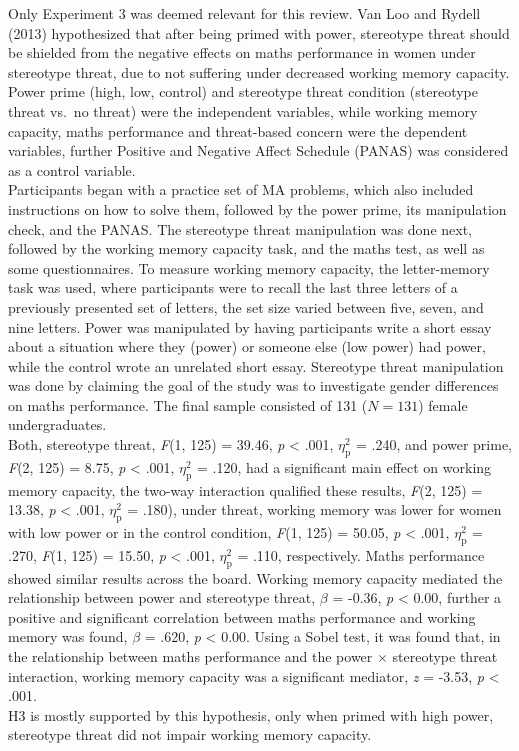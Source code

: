 \documentclass[
  stu,floatsintext]{apa7}
\begin{document}
Only Experiment 3 was deemed relevant for this review.
Van Loo and Rydell (2013) hypothesized that after being primed with power, stereotype threat should be shielded from the negative effects on maths performance in women under stereotype threat, due to not suffering under decreased working memory capacity.\\
Power prime (high, low, control) and stereotype threat condition (stereotype threat vs.~no threat) were the independent variables, while working memory capacity, maths performance and threat-based concern were the dependent variables, further Positive and Negative Affect Schedule (PANAS) was considered as a control variable.\\
Participants began with a practice set of MA problems, which also included instructions on how to solve them, followed by the power prime, its manipulation check, and the PANAS.
The stereotype threat manipulation was done next, followed by the working memory capacity task, and the maths test, as well as some questionnaires.
To measure working memory capacity, the letter-memory task was used, where participants were to recall the last three letters of a previously presented set of letters, the set size varied between five, seven, and nine letters.
Power was manipulated by having participants write a short essay about a situation where they (power) or someone else (low power) had power, while the control wrote an unrelated short essay.
Stereotype threat manipulation was done by claiming the goal of the study was to investigate gender differences on maths performance.
The final sample consisted of 131 (\(N = 131\)) female undergraduates.\\
Both, stereotype threat, \emph{F}(1, 125) = 39.46, \emph{p} \textless{} .001, \(\eta^{2}_{\text{p}}\) = .240, and power prime, \emph{F}(2, 125) = 8.75, \emph{p} \textless{} .001, \(\eta^{2}_{\text{p}}\) = .120, had a significant main effect on working memory capacity, the two-way interaction qualified these results, \emph{F}(2, 125) = 13.38, \emph{p} \textless{} .001, \(\eta^{2}_{\text{p}}\) = .180), under threat, working memory was lower for women with low power or in the control condition, \emph{F}(1, 125) = 50.05, \emph{p} \textless{} .001, \(\eta^{2}_{\text{p}}\) = .270, \emph{F}(1, 125) = 15.50, \emph{p} \textless{} .001, \(\eta^{2}_{\text{p}}\) = .110, respectively.
Maths performance showed similar results across the board.
Working memory capacity mediated the relationship between power and stereotype threat, \(\beta\) = -0.36, \emph{p} \textless{} 0.00, further a positive and significant correlation between maths performance and working memory was found, \(\beta\) = .620, \emph{p} \textless{} 0.00.
Using a Sobel test, it was found that, in the relationship between maths performance and the power \(\times\) stereotype threat interaction, working memory capacity was a significant mediator, \emph{z} = -3.53, \emph{p} \textless{} .001.\\
H3 is mostly supported by this hypothesis, only when primed with high power, stereotype threat did not impair working memory capacity.
\end{document}
